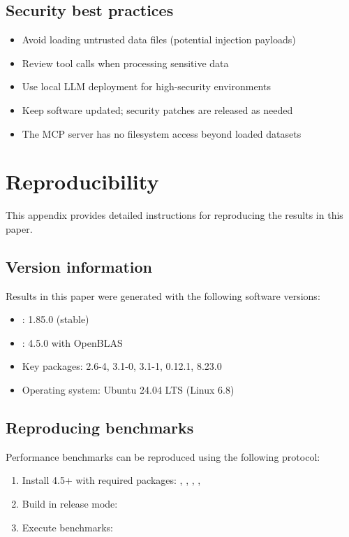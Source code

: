 \subsection{Security best practices}

\begin{itemize}
  \item Avoid loading untrusted data files (potential injection payloads)
  \item Review tool calls when processing sensitive data
  \item Use local LLM deployment for high-security environments
  \item Keep software updated; security patches are released as needed
  \item The MCP server has no filesystem access beyond loaded datasets
\end{itemize}


\section{Reproducibility} \label{app:reproducibility}
\setcounter{table}{0}
\setcounter{figure}{0}

This appendix provides detailed instructions for reproducing the results in this paper.

\subsection{Version information}

Results in this paper were generated with the following software versions:
\begin{itemize}
  \item {}: 1.85.0 (stable)
  \item {}: 4.5.0 with OpenBLAS
  \item Key  packages:  2.6-4,  3.1-0,
     3.1-1,  0.12.1,  8.23.0
  \item Operating system: Ubuntu 24.04 LTS (Linux 6.8)
\end{itemize}

\subsection{Reproducing benchmarks}

Performance benchmarks can be reproduced using the following protocol:
\begin{enumerate}
  \item Install  4.5+ with required packages: , ,
    , , 
  \item Build  in release mode: 
  \item Execute benchmarks: 
\end{enumerate}

